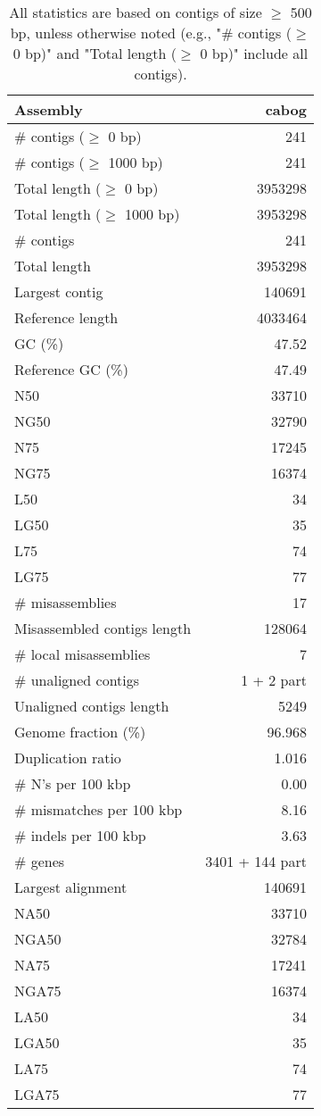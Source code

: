 \documentclass[12pt,a4paper]{article}
\begin{document}
\begin{table}[ht]
\begin{center}
\caption{All statistics are based on contigs of size $\geq$ 500 bp, unless otherwise noted (e.g., "\# contigs ($\geq$ 0 bp)" and "Total length ($\geq$ 0 bp)" include all contigs).}
\begin{tabular}{|l*{1}{|r}|}
\hline
Assembly & cabog \\ \hline
\# contigs ($\geq$ 0 bp) & 241 \\ \hline
\# contigs ($\geq$ 1000 bp) & 241 \\ \hline
Total length ($\geq$ 0 bp) & 3953298 \\ \hline
Total length ($\geq$ 1000 bp) & 3953298 \\ \hline
\# contigs & 241 \\ \hline
Total length & 3953298 \\ \hline
Largest contig & 140691 \\ \hline
Reference length & 4033464 \\ \hline
GC (\%) & 47.52 \\ \hline
Reference GC (\%) & 47.49 \\ \hline
N50 & 33710 \\ \hline
NG50 & 32790 \\ \hline
N75 & 17245 \\ \hline
NG75 & 16374 \\ \hline
L50 & 34 \\ \hline
LG50 & 35 \\ \hline
L75 & 74 \\ \hline
LG75 & 77 \\ \hline
\# misassemblies & 17 \\ \hline
Misassembled contigs length & 128064 \\ \hline
\# local misassemblies & 7 \\ \hline
\# unaligned contigs & 1 + 2 part \\ \hline
Unaligned contigs length & 5249 \\ \hline
Genome fraction (\%) & 96.968 \\ \hline
Duplication ratio & 1.016 \\ \hline
\# N's per 100 kbp & 0.00 \\ \hline
\# mismatches per 100 kbp & 8.16 \\ \hline
\# indels per 100 kbp & 3.63 \\ \hline
\# genes & 3401 + 144 part \\ \hline
Largest alignment & 140691 \\ \hline
NA50 & 33710 \\ \hline
NGA50 & 32784 \\ \hline
NA75 & 17241 \\ \hline
NGA75 & 16374 \\ \hline
LA50 & 34 \\ \hline
LGA50 & 35 \\ \hline
LA75 & 74 \\ \hline
LGA75 & 77 \\ \hline
\end{tabular}
\end{center}
\end{table}
\end{document}
